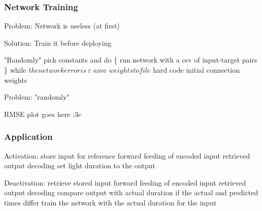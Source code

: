 \begin{frame}
	\begin{center}
		\frametitle{Network Training}
	\end{center}
	Problem:
	Network is useless (at first)
	
	Solution:
	Train it before deploying
	
	"Randomly" pick constants \eta and \alpha
	do \{ run network with a csv of input-target pairs \}
	while \( the network error is \> \varepsilon \)
	save \( weights to file \)
	hard code initial connection weights
	
	Problem: "randomly"
\end{frame}

\begin{frame}
	RMSE plot goes here :3c
\end{frame}

\begin{frame}
	\begin{center}
		\frametitle{Application}
	\end{center}
	Activation:
	store input for reference
	forward feeding of encoded input
	retrieved output decoding
	set light duration to the output
		
	Deactivation:
	retrieve stored input
	forward feeding of encoded input
	retrieved output decoding
	compare output with actual duration
	if the actual and predicted times differ
		train the network with the actual duration for the input
\end{frame}